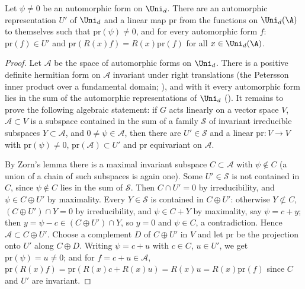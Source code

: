 \begin{lemma}\label{pf:tlift:projex}
Let $\psi\ne0$ be an automorphic form on $\Uni_d$. There are an automorphic representation $U'$ of $\Uni_d$ and a linear
map $\mathrm{pr}$ from the functions on $\Uni_d(\A)$ to themselves such that $\mathrm{pr}(\psi)\ne0$, and for every automorphic form
$f$: $\mathrm{pr}(f)\in U'$ and $\mathrm{pr}(R(x)f)=R(x)\mathrm{pr}(f)$ for all $x\in\Uni_d(\A)$.
\end{lemma}

\begin{proof}
Let $\mathcal A$ be the space of automorphic forms on $\Uni_d$. There is a positive definite hermitian form on $\mathcal A$
invariant under right translations (the Petersson inner product over a fundamental domain;
), and with it every automorphic form lies in the
sum of the automorphic representations of $\Uni_d$ ().
It remains to prove the following algebraic statement: if $G$ acts linearly on a
vector space $V$, $\mathcal A\subset V$ is a subspace contained in the sum of a family $\mathcal S$ of invariant irreducible subspaces
$Y\subset\mathcal A$, and $0\ne\psi\in\mathcal A$, then there are $U'\in\mathcal S$ and a linear $\mathrm{pr}\colon V\to V$ with $\mathrm{pr}(\psi)\ne0$, $\mathrm{pr}(\mathcal A)\subset U'$
and $\mathrm{pr}$ equivariant on $\mathcal A$.

By Zorn's lemma there is a maximal invariant subspace $C\subset\mathcal A$ with $\psi\notin C$ (a union of a chain of such
subspaces is again one). Some $U'\in\mathcal S$ is not contained in $C$, since $\psi\notin C$ lies in the sum of $\mathcal S$. Then
$C\cap U'=0$ by irreducibility, and $\psi\in C\oplus U'$ by maximality. Every $Y\in\mathcal S$ is contained in $C\oplus U'$: otherwise
$Y\not\subset C$, $(C\oplus U')\cap Y=0$ by irreducibility, and $\psi\in C+Y$ by maximality, say $\psi=c+y$; then $y=\psi-c\in(C\oplus U')\cap Y$,
so $y=0$ and $\psi\in C$, a contradiction. Hence $\mathcal A\subset C\oplus U'$. Choose a complement $D$ of $C\oplus U'$ in $V$ and let $\mathrm{pr}$
be the projection onto $U'$ along $C\oplus D$. Writing $\psi=c+u$ with $c\in C$, $u\in U'$, we get $\mathrm{pr}(\psi)=u\ne0$; and for
$f=c+u\in\mathcal A$, $\mathrm{pr}(R(x)f)=\mathrm{pr}(R(x)c+R(x)u)=R(x)u=R(x)\mathrm{pr}(f)$ since $C$ and $U'$ are invariant.
\end{proof}

